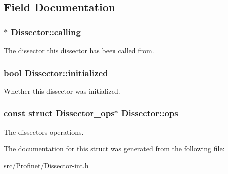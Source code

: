 \subsection{Field Documentation}
\hypertarget{struct_dissector_a9c793579ef8c1fa11c26a0d146bc2f2c}{
\subsubsection[{calling}]{$\ast$ Dissector\-::calling}}\label{struct_dissector_a9c793579ef8c1fa11c26a0d146bc2f2c}
The dissector this dissector has been called from. \hypertarget{struct_dissector_a86386b01b6edc229f64d438929d92a4f}{
\subsubsection[{initialized}]{\setlength{\rightskip}{0pt plus 5cm}bool Dissector\-::initialized}}\label{struct_dissector_a86386b01b6edc229f64d438929d92a4f}
Whether this dissector was initialized. \hypertarget{struct_dissector_a2786b3015a49f746ecbbc33840838a4e}{
\subsubsection[{ops}]{\setlength{\rightskip}{0pt plus 5cm}const struct {\bf Dissector\-\_\-ops}$\ast$ Dissector\-::ops}}\label{struct_dissector_a2786b3015a49f746ecbbc33840838a4e}
The dissectors operations. 

The documentation for this struct was generated from the following file\-:\begin{DoxyCompactItemize}
\item 
src/\-Profinet/\hyperlink{_dissector-int_8h}{Dissector-\/int.\-h}\end{DoxyCompactItemize}
